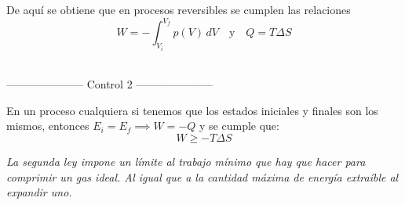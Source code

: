 De aquí se obtiene que en procesos reversibles se cumplen las relaciones \[W = -\int_{V_i}^{V_f} p(V)\,dV \quad \text{y} \quad Q = T\Delta S\]
\\

\begin{center}
--------------------- Control 2 ---------------------
\end{center}

En un proceso cualquiera si tenemos que los estados iniciales y finales son los mismos, entonces $E_i = E_f \implies W = -Q$ y se cumple que:
\[\boxed{W \geq -T\Delta S}\]

\textit{La segunda ley impone un límite al trabajo mínimo que hay que hacer para comprimir un gas ideal. Al igual que a la cantidad máxima de energía extraíble al expandir uno.}
